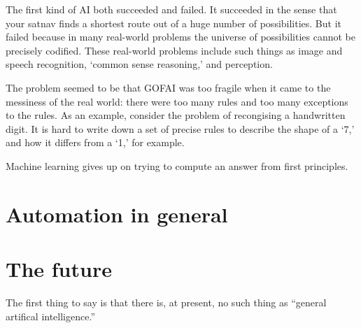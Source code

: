 \documentclass[10pt, a4paper, twocolumn]{article}
\begin{document}
The first kind of AI both succeeded and failed. It succeeded in the sense that
your satnav finds a shortest route out of a huge number of possibilities. But it
failed because in many real-world problems the universe of possibilities cannot
be precisely codified. These real-world problems include such things as image
and speech recognition, `common sense reasoning,' and perception.

The problem seemed to be that GOFAI was too fragile when it came to the
messiness of the real world: there were too many rules and too many exceptions
to the rules. As an example, consider the problem of recongising a handwritten
digit. It is hard to write down a set of precise rules to describe the shape of
a `7,' and how it differs from a `1,' for example.

Machine learning gives up on trying to compute an answer from first principles. 









\section{Automation in general}

\section{The future}

The first thing to say is that there is, at present, no such thing as ``general
artifical intelligence.''
\end{document}
